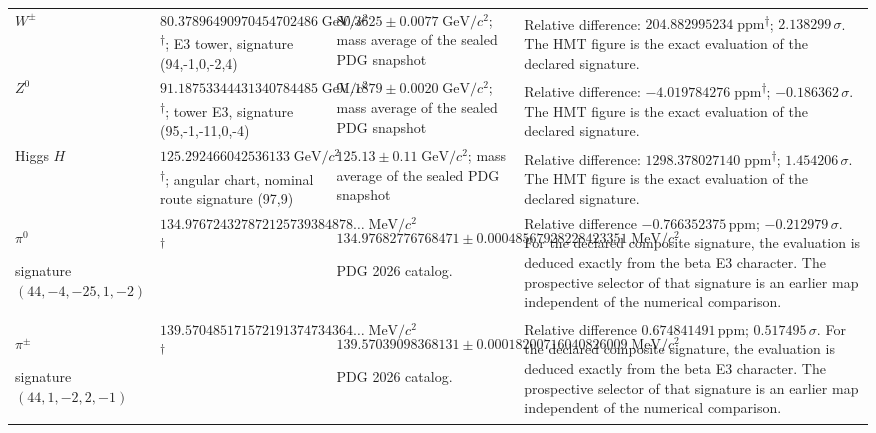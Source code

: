 \begin{longtable}{@{}>{\raggedright\arraybackslash}p{}>{\raggedright\arraybackslash}p{}>{\raggedright\arraybackslash}p{}>{\raggedright\arraybackslash}p{}@{}}
$W^\pm$ & $80.378964\allowbreak{}909704\allowbreak{}547024\allowbreak{}86\;\mathrm{GeV}/c^2$\textsuperscript{\(\dagger\)}; E3 tower, signature (94,-1,0,-2,4) & $80.3625\pm0.0077\;\mathrm{GeV}/c^2$; mass average of the sealed PDG snapshot & Relative difference: $204.882995\allowbreak{}234\;\mathrm{ppm}$\textsuperscript{\(\dagger\)}; $2.138299\,\sigma$. The HMT figure is the exact evaluation of the declared signature. \\
$Z^0$ & $91.187533\allowbreak{}444313\allowbreak{}407844\allowbreak{}85\;\mathrm{GeV}/c^2$\textsuperscript{\(\dagger\)}; tower E3, signature (95,-1,-11,0,-4) & $91.1879\pm0.0020\;\mathrm{GeV}/c^2$; mass average of the sealed PDG snapshot & Relative difference: $-4.019784\allowbreak{}276\;\mathrm{ppm}$\textsuperscript{\(\dagger\)}; $-0.186362\,\sigma$. The HMT figure is the exact evaluation of the declared signature. \\
Higgs $H$ & $125.292466\allowbreak{}042536\allowbreak{}133\;\mathrm{GeV}/c^2$\textsuperscript{\(\dagger\)}; angular chart, nominal route signature (97,9) & $125.13\pm0.11\;\mathrm{GeV}/c^2$; mass average of the sealed PDG snapshot & Relative difference: $1298.378027\allowbreak{}140\;\mathrm{ppm}$\textsuperscript{\(\dagger\)}; $1.454206\,\sigma$. The HMT figure is the exact evaluation of the declared signature. \\
$\pi^0$\par signature $(44,\allowbreak -4,\allowbreak -25,\allowbreak 1,\allowbreak -2)$ & $134.976724\allowbreak{}327872\allowbreak{}125739\allowbreak{}384878\ldots\;\mathrm{MeV}/c^2$\textsuperscript{\(\dagger\)} & $134.976827\allowbreak{}767684\allowbreak{}71\pm 0.000485\allowbreak{}679282\allowbreak{}284233\allowbreak{}51\;\mathrm{MeV}/c^2$\par\footnotesize PDG 2026 catalog. & Relative difference $-0.766352\allowbreak{}375\,\mathrm{ppm}$; $-0.212979\,\sigma$. For the declared composite signature, the evaluation is deduced exactly from the beta E3 character. The prospective selector of that signature is an earlier map independent of the numerical comparison. \\
$\pi^\pm$\par signature $(44,\allowbreak 1,\allowbreak -2,\allowbreak 2,\allowbreak -1)$ & $139.570485\allowbreak{}171572\allowbreak{}191374\allowbreak{}734364\ldots\;\mathrm{MeV}/c^2$\textsuperscript{\(\dagger\)} & $139.570390\allowbreak{}983681\allowbreak{}31\pm 0.000182\allowbreak{}007160\allowbreak{}408260\allowbreak{}09\;\mathrm{MeV}/c^2$\par\footnotesize PDG 2026 catalog. & Relative difference $0.674841\allowbreak{}491\,\mathrm{ppm}$; $0.517495\,\sigma$. For the declared composite signature, the evaluation is deduced exactly from the beta E3 character. The prospective selector of that signature is an earlier map independent of the numerical comparison. \\

\end{longtable}
